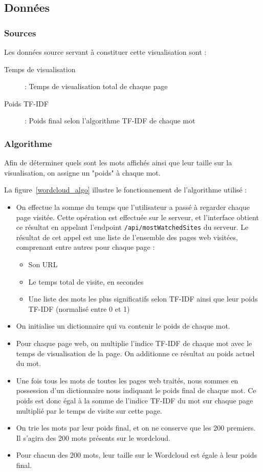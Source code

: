	\subsection{Données}

		\subsubsection{Sources}

			Les données source servant à constituer cette visualisation sont :
			\begin{description}
				\item[Temps de visualisation] : Temps de visualisation total de chaque page 
				\item[Poids TF-IDF] : Poids final selon l'algorithme TF-IDF de chaque mot
			\end{description}

		\subsubsection{Algorithme}

			Afin de déterminer quels sont les mots affichés ainsi que leur taille sur la visualisation, on assigne un "poids" à chaque mot.

			La figure~\ref{wordcloud_algo} illustre le fonctionnement de l'algorithme utilisé :
			\begin{itemize}
				\item On effectue la somme du temps que l'utilisateur a passé à regarder chaque page visitée. Cette opération est effectuée sur le serveur, et l'interface obtient ce résultat en appelant l'endpoint \texttt{/api/mostWatchedSites} du serveur. Le résultat de cet appel est une liste de l'ensemble des pages web visitées, comprenant entre autres pour chaque page : 
				\begin{itemize}
					\item Son URL
					\item Le temps total de visite, en secondes
					\item Une liste des mots les plus significatifs selon TF-IDF ainsi que leur poids TF-IDF (normalisé entre 0 et 1)
				\end{itemize}
				\item On initialise un dictionnaire qui va contenir le poids de chaque mot.
				\item Pour chaque page web, on multiplie l'indice TF-IDF de chaque mot avec le temps de visualisation de la page. On additionne ce résultat au poids actuel du mot.
				\item Une fois tous les mots de toutes les pages web traités, nous sommes en possession d'un dictionnaire nous indiquant le poids final de chaque mot. Ce poids est donc égal à la somme de l'indice TF-IDF du mot sur chaque page multiplié par le temps de visite sur cette page.
				\item On trie les mots par leur poids final, et on ne conserve que les 200 premiers. Il s'agira des 200 mots présents sur le wordcloud.
				\item Pour chacun des 200 mots, leur taille sur le Wordcloud est égale à leur poids final.
			\end{itemize}

